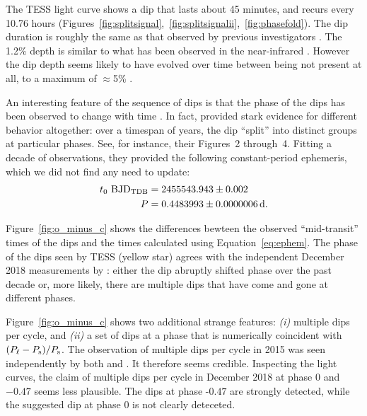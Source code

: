 \documentclass[12pt,twocolumn,tighten,trackchanges]{aastex62}
\begin{document}
The TESS light curve shows a dip that lasts about 45 minutes, and
recurs every 10.76 hours
(Figures~\ref{fig:splitsignal},~\ref{fig:splitsignalii},~\ref{fig:phasefold}).
The dip duration is roughly the same as that observed by previous
investigators \citep{van_eyken_ptf_2012,yu_tests_2015}.  The 1.2\%
depth is similar to what has been observed in the near-infrared
\citep{onitsuka_multicolor_2017}.  However the dip depth seems likely
to have evolved over time between being not present at all, to a
maximum of $\approx$5\% \citep[{\it
e.g.},][]{koen_multicolour_2015,yu_tests_2015,tanimoto_evidence_2020}.

An interesting feature of the sequence of dips is that the phase of
the dips has been observed to change with time \citep{yu_tests_2015}.
In fact, \citet{tanimoto_evidence_2020} provided stark evidence for
different behavior altogether: over a timespan of years, the dip
``split'' into distinct groups at particular phases.  See, for
instance, their Figures~2 through~4.  Fitting a decade of
observations, they provided the following constant-period ephemeris,
which we did not find any need to update:
\begin{align}
t_0\ {\rm BJD}_{\rm TDB} &= 2455543.943 \pm 0.002 \nonumber \\
P &= 0.4483993 \pm 0.0000006\,{\rm d}.
\label{eq:ephem}
\end{align}

Figure~\ref{fig:o_minus_c} shows the differences bewteen the observed
``mid-transit'' times of the dips and the times calculated using
Equation~\ref{eq:ephem}.  The phase of the dips seen by TESS (yellow
star) agrees with the independent December 2018 measurements by
\citet{tanimoto_evidence_2020}: either the dip abruptly shifted phase
over the past decade or, more likely, there are multiple dips that
have come and gone at different phases.

Figure~\ref{fig:o_minus_c} shows two additional strange features: {\it
(i)}  multiple dips per cycle, and {\it (ii)} a set of dips at a phase
that is numerically coincident with $(P_{\rm \ell} - P_{\rm s}) /
P_{\rm s}$.  The observation of multiple dips per cycle in 2015 was
seen independently by both \citet{yu_tests_2015} and
\citet{tanimoto_evidence_2020}.  It therefore seems credible.
Inspecting the \citet{tanimoto_evidence_2020} light curves, the claim
of multiple dips per cycle in December 2018 at phase 0 and $-0{.}47$
seems less plausible. The dips at phase $\text{-}0{.}47$ are strongly
detected, while the suggested dip at phase 0 is not clearly deteceted.
\end{document}
